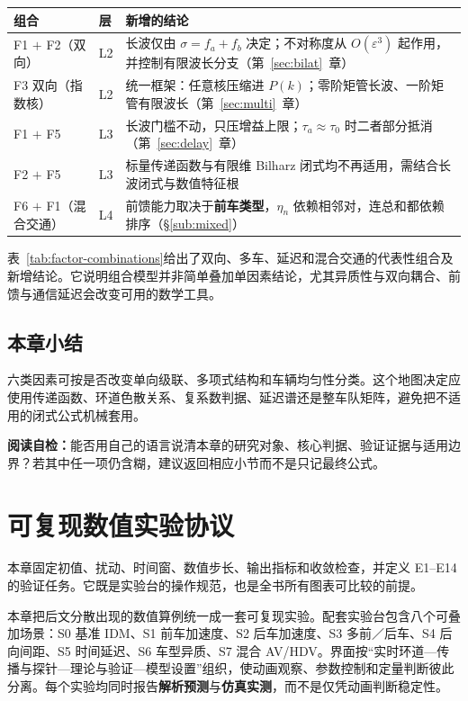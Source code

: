 \documentclass[11pt,a4paper,openany]{book}
\numberwithin{equation}{chapter}
\numberwithin{figure}{chapter}
\numberwithin{table}{chapter}
\newcommand{\tabletext}[2]{%
  \par\smallskip\noindent
  表~\ref{#1}给出了#2
  \par\smallskip
}
\newcommand{\sectionwrapup}[1]{%
  \section{本章小结}
  \begin{tcolorbox}[summarybox,title=\textbf{章末回顾}]
  #1
  \par\smallskip
  \textbf{阅读自检：}能否用自己的语言说清本章的研究对象、核心判据、验证证据与适用边界？若其中任一项仍含糊，建议返回相应小节而不是只记最终公式。
  \end{tcolorbox}
  \clearpage
}
\newcommand{\chapterguide}[2]{%
  \begin{tcolorbox}[chapterguide,title=\textbf{本章导学：#1}]
  #2
  \end{tcolorbox}}
\begin{document}
\begin{center}
\small
{}
\label{tab:factor-combinations}
\begin{tabular}{p{3.8cm}p{2.0cm}p{7.4cm}}
\toprule
\textbf{组合} & \textbf{层} & \textbf{新增的结论} \\
\midrule
F1 $+$ F2（双向） & L2 & 长波仅由 $\sigma=f_a+f_b$ 决定；不对称度从 $O(\varepsilon^3)$ 起作用，并控制有限波长分支（第~\ref{sec:bilat}~章） \\[6pt]
F3 双向（指数核） & L2 & 统一框架：任意核压缩进 $P(k)$；零阶矩管长波、一阶矩管有限波长（第~\ref{sec:multi}~章） \\[6pt]
F1 $+$ F5 & L3 & 长波门槛不动，只压增益上限；$\tau_a\approx\tau_0$ 时二者部分抵消（第~\ref{sec:delay}~章） \\[6pt]
F2 $+$ F5 & L3 & 标量传递函数与有限维 Bilharz 闭式均不再适用，需结合长波闭式与数值特征根 \\[6pt]
F6 $+$ F1（混合交通） & L4 & 前馈能力取决于\textbf{前车类型}，$\eta_n$ 依赖相邻对，连总和都依赖排序（\S\ref{sub:mixed}） \\
\bottomrule
\end{tabular}
\end{center}
\tabletext{tab:factor-combinations}{双向、多车、延迟和混合交通的代表性组合及新增结论。它说明组合模型并非简单叠加单因素结论，尤其异质性与双向耦合、前馈与通信延迟会改变可用的数学工具。}

\sectionwrapup{六类因素可按是否改变单向级联、多项式结构和车辆均匀性分类。这个地图决定应使用传递函数、环道色散关系、复系数判据、延迟谱还是整车队矩阵，避免把不适用的闭式公式机械套用。}

\chapter{可复现数值实验协议}
\label{sec:protocol}
\chapterguide{怎样让“理论与仿真一致”成为可检查的结论}{本章固定初值、扰动、时间窗、数值步长、输出指标和收敛检查，并定义 E1--E14 的验证任务。它既是实验台的操作规范，也是全书所有图表可比较的前提。}

本章把后文分散出现的数值算例统一成一套可复现实验。配套实验台包含八个可叠加场景：S0 基准 IDM、S1 前车加速度、S2 后车加速度、S3 多前／后车、S4 后向间距、S5 时间延迟、S6 车型异质、S7 混合 AV/HDV。界面按“实时环道—传播与探针—理论与验证—模型设置”组织，使动画观察、参数控制和定量判断彼此分离。每个实验均同时报告\textbf{解析预测}与\textbf{仿真实测}，而不是仅凭动画判断稳定性。
\end{document}
